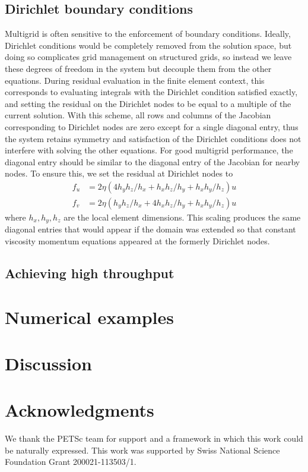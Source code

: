 \documentclass[10pt,letterpaper,oneeqnum,final]{siamltex}
\begin{document}
\subsection{Dirichlet boundary conditions}\label{ssec:dirichlet}
Multigrid is often sensitive to the enforcement of boundary conditions.  Ideally, Dirichlet
conditions would be completely removed from the solution space, but doing so complicates grid
management on structured grids, so instead we leave these degrees of freedom in the system but
decouple them from the other equations.  During residual evaluation in the finite element context,
this corresponds to evaluating integrals with the Dirichlet condition satisfied exactly, and setting
the residual on the Dirichlet nodes to be equal to a multiple of the current solution.  With this
scheme, all rows and columns of the Jacobian corresponding to Dirichlet nodes are zero except for a
single diagonal entry, thus the system retains symmetry and satisfaction of the Dirichlet conditions
does not interfere with solving the other equations.  For good multigrid performance, the diagonal
entry should be similar to the diagonal entry of the Jacobian for nearby nodes.  To ensure this, we
set the residual at Dirichlet nodes to
\begin{align}\label{eq:dirichlet-scale}
  f_u &= 2 \eta (4 h_yh_z/h_x + h_x h_z/h_y + h_x h_y/h_z) u \\
  f_v &= 2 \eta (h_yh_z/h_x + 4 h_x h_z/h_y + h_x h_y/h_z) u
\end{align}
where $h_x,h_y,h_z$ are the local element dimensions.  This scaling produces the same diagonal
entries that would appear if the domain was extended so that constant viscosity momentum equations
appeared at the formerly Dirichlet nodes.

\subsection{Achieving high throughput}

\section{Numerical examples}\label{sec:examples}

\section{Discussion}

\nonumber\section{Acknowledgments} We thank the PETSc team for support and a framework in which this
work could be naturally expressed.  This work was supported by Swiss National Science Foundation
Grant 200021-113503/1.



\end{document}
